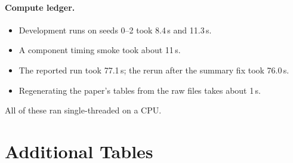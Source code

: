 \documentclass{article}
\theoremstyle{plain}
\theoremstyle{definition}
\theoremstyle{remark}
\newcommand{\LN}{\textsc{ln}}
\begin{document}
\paragraph{Compute ledger.}
\begin{itemize}
  \item Development runs on seeds 0--2 took 8.4\,s and 11.3\,s.
  \item A component timing smoke took about 11\,s.
  \item The reported run took 77.1\,s; the rerun after the summary fix took 76.0\,s.
  \item Regenerating the paper's tables from the raw files takes about 1\,s.
\end{itemize}
All of these ran single-threaded on a CPU.

\section{Additional Tables}
\label{app:tables}
\begin{table}[h]
  \caption{Linear regimes (20 instances each; medians of per-instance means). Leakage is
  $\|\Delta a_{-j}\|/\alpha$. Norms (in parentheses) are relative to $\|\alpha D_j\|$.
  ``Resid.'' is the relative residual of the \LN{} system.}
  \label{tab:linear}
  \centering
  \small
  
\end{table}

\begin{table}[h]
  \caption{Feasibility and boundary checks (20 seeds; counts of passing rows).}
  \label{tab:feas}
  \centering
  \small
  
\end{table}

\begin{table}[h]
  \caption{Norm budgets (pre-registered dense ReLU, active target, $\alpha = 1$; medians over
  20 instances). $\tau = \|\alpha D_j\|$.}
  \label{tab:budget}
  \centering
  \small
  
\end{table}

\begin{table}[h]
  \caption{Pre-registered active-set setting for all activations (same columns as
  \cref{tab:relu}). $^\dagger$: target value range-infeasible (JumpReLU, $\alpha<\theta$).}
  \label{tab:activeset-all}
  \centering
  \small
  
\end{table}

\begin{table}[h]
  \caption{Exploratory sparser ReLU settings (added after development seeds).}
  \label{tab:sparse}
  \centering
  \small
  
\end{table}
\end{document}
